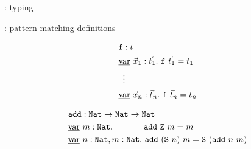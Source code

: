 \documentclass{beamer}
\begin{document}
\begin{frame}{\typetheory: typing}
    \pause



    \begin{prooftree}
    \end{prooftree}
\end{frame}

\newcommand\ttvar{\text{\underline{var}}}

\begin{frame}{\typetheory: pattern matching definitions}

    \begin{align*}
        &\texttt{f} : t \\
        &\ttvar\ \vec{x}_1 : \vec{t}_1.\ \texttt{f}\ \vec{t}_1 = t_1 \\
        &\, \ \vdots \\
        &\ttvar\ \vec{x}_n : \vec{t}_n.\ \texttt{f}\ \vec{t}_n = t_n \\
    \end{align*}

    \pause

    \begin{align*}
        &\texttt{add} : \texttt{Nat} \to \texttt{Nat} \to \texttt{Nat} \\
        &\ttvar\ m : \texttt{Nat}.\ \quad \quad \quad \ \texttt{add}\ \texttt{Z}\ m = m \\
        &\ttvar\ n : \texttt{Nat}, m : \texttt{Nat}.\ \texttt{add}\ (\texttt{S}\ n)\ m = \texttt{S}\ (\texttt{add}\ n\ m) \\
    \end{align*}

\end{frame}
\end{document}
